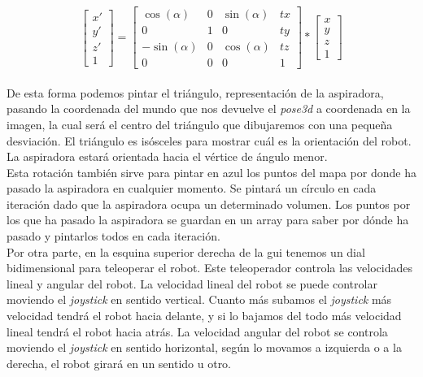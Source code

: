 \begin{equation}
\label{ec.matriz_roomba}
\left[\begin{array}{cc}
x' \\ 
y' \\
z' \\
1
\end{array}\right] = \left[\begin{array}{cccc}
\cos(\alpha) & 0 & \sin(\alpha) & tx \\ 
0 & 1 & 0 & ty\\
-\sin(\alpha) & 0 & \cos(\alpha) & tz \\
0 & 0 & 0 & 1
\end{array}\right]* \left[\begin{array}{cc}
x \\ 
y \\
z \\
1
\end{array}\right]
\end{equation}
\\

De esta forma podemos pintar el triángulo, representación de la aspiradora, pasando la coordenada del mundo que nos devuelve el \textit{pose3d} a coordenada en la imagen, la cual será el centro del triángulo que dibujaremos con una pequeña desviación. El triángulo es isósceles para mostrar cuál es la orientación del robot. La aspiradora estará orientada hacia el vértice de ángulo menor.\\

Esta rotación también sirve para pintar en azul los puntos del mapa por donde ha pasado la aspiradora en cualquier momento. Se pintará un círculo en cada iteración dado que la aspiradora ocupa un determinado volumen. Los puntos por los que ha pasado la aspiradora se guardan en un array para saber por dónde ha pasado y pintarlos todos en cada iteración.\\

Por otra parte, en la esquina superior derecha de la \acrshort{gui} tenemos un dial bidimensional para teleoperar el robot. Este teleoperador controla las velocidades lineal y angular del robot. La velocidad lineal del robot se puede controlar moviendo el \textit{joystick} en sentido vertical. Cuanto más subamos el \textit{joystick} más velocidad tendrá el robot hacia delante, y si lo bajamos del todo más velocidad lineal tendrá el robot hacia atrás. La velocidad angular del robot se controla moviendo el \textit{joystick} en sentido horizontal, según lo movamos a izquierda o a la derecha, el robot girará en un sentido u otro.\\


